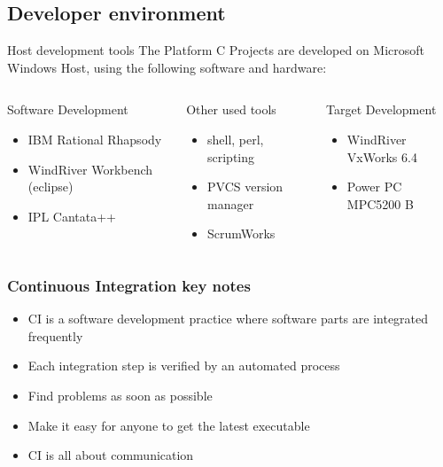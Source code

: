 \documentclass{beamer}
\begin{document}
\subsection[Developer environment]{Developer environment}
\begin{frame}{Host development tools}
The Platform C Projects are developed on Microsoft Windows Host, using the
following software and hardware:
\begin{columns}
	\begin{block}{Software Development}
	\begin{itemize}
		\item<1-> IBM Rational Rhapsody
  		\item<2-> WindRiver Workbench (eclipse) 
  		\item<3-> IPL Cantata++
    \end{itemize}
    \end{block}

	\begin{block}{Other used tools}
	\begin{itemize}
      \item<4-> shell, perl, scripting
      \item<5-> PVCS version manager
      \item<6-> ScrumWorks 
    \end{itemize}
    \end{block}

	\begin{block}{Target Development}
	\begin{itemize}
      \item<7->WindRiver VxWorks 6.4
  	  \item<8-> Power PC MPC5200 B
    \end{itemize}
    \end{block}
\end{columns}
\end{frame}

\begin{frame}
\frametitle{Continuous Integration key notes}
\begin{itemize}
  \item<1-> CI is a software development practice where software parts are
  integrated frequently
  \item<2-> Each integration step is verified by an automated process
  \item<3-> Find problems as soon as possible
  \item<4-> Make it easy for anyone to get the latest executable
  \item<5-> CI is all about communication
\end{itemize}
\end{frame}
\end{document}
